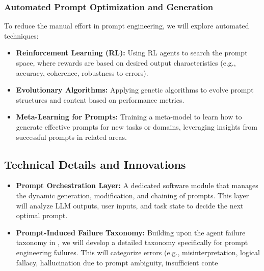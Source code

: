 \documentclass{article}
\begin{document}
\subsubsection{Automated Prompt Optimization and Generation}
To reduce the manual effort in prompt engineering, we will explore automated techniques:
\begin{itemize}
    \item \textbf{Reinforcement Learning (RL):} Using RL agents to search the prompt space, where rewards are based on desired output characteristics (e.g., accuracy, coherence, robustness to errors).
    \item \textbf{Evolutionary Algorithms:} Applying genetic algorithms to evolve prompt structures and content based on performance metrics.    
    \item \textbf{Meta-Learning for Prompts:} Training a meta-model to learn how to generate effective prompts for new tasks or domains, leveraging insights from successful prompts in related areas.
\end{itemize}

\subsection{Technical Details and Innovations}

\begin{itemize}
    \item \textbf{Prompt Orchestration Layer:} A dedicated software module that manages the dynamic generation, modification, and chaining of prompts. This layer will analyze LLM outputs, user inputs, and task state to decide the next optimal prompt.
    \item \textbf{Prompt-Induced Failure Taxonomy:} Building upon the agent failure taxonomy in \cite{paper1_agents}, we will develop a detailed taxonomy specifically for prompt engineering failures. This will categorize errors (e.g., misinterpretation, logical fallacy, hallucination due to prompt ambiguity, insufficient conte
\end{itemize}
\end{document}
